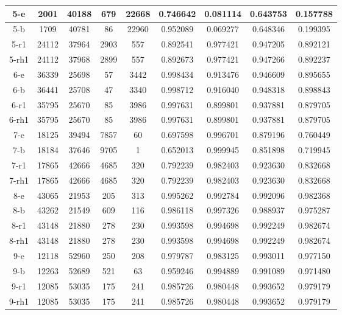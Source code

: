 \begin{longtable}[!h]{|c|c|c|c|c|c|c|c|c|}
	\hline \rowcolor{bad}	5-e	&	2001	&	40188	&	679	&	22668	&	0.746642	&	0.081114	&	0.643753	&	0.157788	\\
	\hline	5-b	&	1709	&	40781	&	86	&	22960	&	0.952089	&	0.069277	&	0.648346	&	0.199395	\\
	\hline	5-r1	&	24112	&	37964	&	2903	&	557	&	0.892541	&	0.977421	&	0.947205	&	0.892121	\\
	\hline \rowcolor{closest}	5-rh1	&	24112	&	37968	&	2899	&	557	&	0.892673	&	0.977421	&	0.947266	&	0.892237	\\
	
	\hline	6-e	&	36339	&	25698	&	57	&	3442	&	0.998434	&	0.913476	&	0.946609	&	0.895655	\\
	\hline \rowcolor{closest}	6-b	&	36441	&	25708	&	47	&	3340	&	0.998712	&	0.916040	&	0.948318	&	0.898843	\\
	\hline \rowcolor{bad}	6-r1	&	35795	&	25670	&	85	&	3986	&	0.997631	&	0.899801	&	0.937881	&	0.879705	\\
	\hline \rowcolor{bad}	6-rh1	&	35795	&	25670	&	85	&	3986	&	0.997631	&	0.899801	&	0.937881	&	0.879705	\\
	
	\hline	7-e	&	18125	&	39494	&	7857	&	60	&	0.697598	&	0.996701	&	0.879196	&	0.760449	\\
	\hline \rowcolor{bad}	7-b	&	18184	&	37646	&	9705	&	1	&	0.652013	&	0.999945	&	0.851898	&	0.719945	\\
	\hline \rowcolor{closest}	7-r1	&	17865	&	42666	&	4685	&	320	&	0.792239	&	0.982403	&	0.923630	&	0.832668	\\
	\hline \rowcolor{closest}	7-rh1	&	17865	&	42666	&	4685	&	320	&	0.792239	&	0.982403	&	0.923630	&	0.832668	\\
	
	\hline	8-e	&	43065	&	21953	&	205	&	313	&	0.995262	&	0.992784	&	0.992096	&	0.982368	\\
	\hline \rowcolor{bad}	8-b	&	43262	&	21549	&	609	&	116	&	0.986118	&	0.997326	&	0.988937	&	0.975287	\\
	\hline \rowcolor{closest}	8-r1	&	43148	&	21880	&	278	&	230	&	0.993598	&	0.994698	&	0.992249	&	0.982674	\\
	\hline \rowcolor{closest}	8-rh1	&	43148	&	21880	&	278	&	230	&	0.993598	&	0.994698	&	0.992249	&	0.982674	\\
	
	\hline	9-e	&	12118	&	52960	&	250	&	208	&	0.979787	&	0.983125	&	0.993011	&	0.977150	\\
	\hline \rowcolor{bad}	9-b	&	12263	&	52689	&	521	&	63	&	0.959246	&	0.994889	&	0.991089	&	0.971480	\\
	\hline \rowcolor{closest}	9-r1	&	12085	&	53035	&	175	&	241	&	0.985726	&	0.980448	&	0.993652	&	0.979179	\\
	\hline \rowcolor{closest}	9-rh1	&	12085	&	53035	&	175	&	241	&	0.985726	&	0.980448	&	0.993652	&	0.979179	\\
	

\end{longtable}
